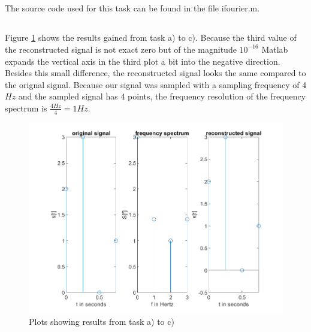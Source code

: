 \documentclass{article}
\begin{document}
\subsection{}
The source code used for this task can be found in the file ifourier.m.

\subsection{}
Figure \ref{results} shows the results gained from task a) to c). Because the third value of the reconstructed signal is not exact zero but of the magnitude $10^{-16}$ Matlab expands the vertical axis in the third plot a bit into the negative direction. Besides this small difference, the reconstructed signal looks the same compared to the orignal signal. Because our signal was sampled with a sampling frequency of 4$\si{Hz}$ and the sampled signal has 4 points, the frequency resolution of the frequency spectrum is $\frac{4\si{Hz}}{4} = 1\si{Hz}$.

\begin{figure}[H]
  \begin{center}
    \includegraphics[width=\textwidth]{./images/figure_d.png}
    \caption{Plots showing results from task a) to c)}
    \label{results}
  \end{center}
\end{figure}

\clearpage
\end{document}
